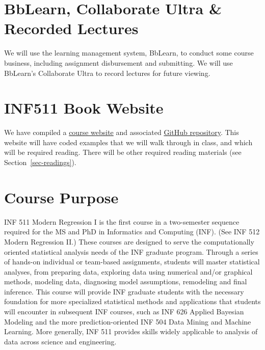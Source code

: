\documentclass[
  letterpaper,
  DIV=11,
  numbers=noendperiod]{scrreprt}
\begin{document}
\hypertarget{bblearn-collaborate-ultra-recorded-lectures}{%
\section{BbLearn, Collaborate Ultra \& Recorded
Lectures}\label{bblearn-collaborate-ultra-recorded-lectures}}

We will use the learning management system, BbLearn, to conduct some
course business, including assignment disbursement and submitting. We
will use BbLearn's Collaborate Ultra to record lectures for future
viewing.

\hypertarget{inf511-book-website}{%
\section{INF511 Book Website}\label{inf511-book-website}}

We have compiled a
\href{https://joseph-mihaljevic.github.io/inf511-book/}{course website}
and associated
\href{https://github.com/joseph-mihaljevic/inf511-book}{GitHub
repository}. This website will have coded examples that we will walk
through in class, and which will be required reading. There will be
other required reading materials (see Section~\ref{sec-readings}).

\hypertarget{course-purpose}{%
\section{Course Purpose}\label{course-purpose}}

INF 511 Modern Regression I is the first course in a two-semester
sequence required for the MS and PhD in Informatics and Computing (INF).
(See INF 512 Modern Regression II.) These courses are designed to serve
the computationally oriented statistical analysis needs of the INF
graduate program. Through a series of hands-on individual or team-based
assignments, students will master statistical analyses, from preparing
data, exploring data using numerical and/or graphical methods, modeling
data, diagnosing model assumptions, remodeling and final inference. This
course will provide INF graduate students with the necessary foundation
for more specialized statistical methods and applications that students
will encounter in subsequent INF courses, such as INF 626 Applied
Bayesian Modeling and the more prediction-oriented INF 504 Data Mining
and Machine Learning. More generally, INF 511 provides skills widely
applicable to analysis of data across science and engineering.
\end{document}
